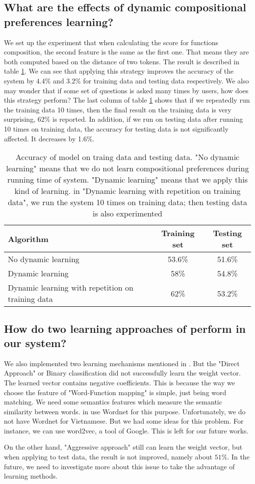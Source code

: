 \subsection{What are the effects of dynamic compositional preferences learning?}
We set up the experiment that when calculating the score for functions composition, the second feature is the same as the first one. That means they are both computed based on the distance of two tokens. The result is described in table \ref{d-c-p-eff}. We can see that applying this strategy improves the accuracy of the system by $4.4\%$ and $3.2\%$ for training data and testing data respectively. We also may wonder that if some set of questions is asked many times by users, how does this strategy perform? The last column of table \ref{d-c-p-eff} shows that if we repeatedly run the training data 10 times, then the final result on the training data is very surprising, $62\%$ is reported. In addition, if we run on testing data after running 10 times on training data, the accuracy for testing data is not significantly affected. It decreases by 1.6\%. 
\begin{table}[h] 
	\begin{center}
	    \begin{tabular}{| p{5cm} | c | c |}
	    \hline
	    Algorithm & Training set & Testing set \\ \hline
		No dynamic learning & 53.6\% & 51.6\%  \\ \hline
	    Dynamic learning & 58\% & 54.8\%  \\ \hline
	    Dynamic learning with repetition on training data & 62\% & 53.2\%  \\
	    \hline
	    \end{tabular}        
	\end{center}
	\scriptsize
	\caption{Accuracy of model on traing data and testing data. "No dynamic learning" means that we do not learn compositional preferences during running time of system. "Dynamic learning" means that we apply this kind of learning. in "Dynamic learning with repetition on training data", we run the system 10 times on training data; then testing data is also experimented}
    \label{d-c-p-eff}
\end{table}

\subsection{How do two learning approaches of \cite{Clarke:2010:DSP:1870568.1870571} perform in our system?}
We also implemented two learning mechanisms mentioned in \cite{Clarke:2010:DSP:1870568.1870571}. But the "Direct Approach" or Binary classification did not successfully learn the weight vector. The learned vector contains negative coefficients. This is because the way we choose the feature of "Word-Function mapping" is simple, just being word matching. We need some semantics features which measure the semantic similarity between words. \citeauthor{Clarke:2010:DSP:1870568.1870571} in \cite{Clarke:2010:DSP:1870568.1870571} use Wordnet for this purpose. Unfortunately, we do not have Wordnet for Vietnamese. But we had some ideas for this problem. For instance, we can use word2vec, a tool of Google. This is left for our future works.

On the other hand, "Aggressive approach" still can learn the weight vector, but when applying to test data, the result is not improved, namely about $51\%$. In the future, we need to investigate more about this issue to take the advantage of learning methods.